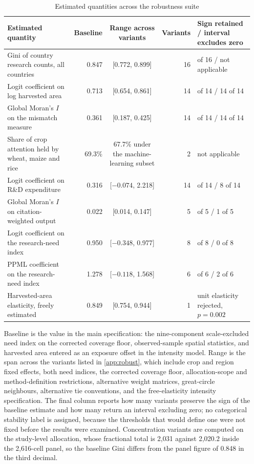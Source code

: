 \documentclass[ASNA,twocolumn]{USG}
\begin{document}
\begin{table}[!t]
\centering
\footnotesize
\setlength{\tabcolsep}{4pt}
\renewcommand{\arraystretch}{1.12}
\caption{Estimated quantities across the robustness suite}
\label{tab:robust}
\begin{tabular}{@{}>{\raggedright\arraybackslash}p{5.1cm}
                  r c r >{\raggedright\arraybackslash}p{3.9cm}@{}}
\toprule
Estimated quantity & Baseline & Range across variants & Variants & Sign retained / interval excludes zero \\
\midrule
Gini of country research counts, all countries & 0.847 & [0.772, 0.899] & 16 & 16 of 16 / not applicable \\
Logit coefficient on log harvested area & 0.713 & [0.654, 0.861] & 14 & 14 of 14 / 14 of 14 \\
Global Moran's $I$ on the mismatch measure & 0.361 & [0.187, 0.425] & 14 & 14 of 14 / 14 of 14 \\
Share of crop attention held by wheat, maize and rice & 69.3\% & 67.7\% under the machine-learning subset & 2 & not applicable \\
Logit coefficient on R\&D expenditure & 0.316 & [$-0.074$, 2.218] & 14 & 12 of 14 / 8 of 14 \\
Global Moran's $I$ on citation-weighted output & 0.022 & [0.014, 0.147] & 5 & 5 of 5 / 1 of 5 \\
Logit coefficient on the research-need index & 0.950 & [$-0.348$, 0.977] & 8 & 6 of 8 / 0 of 8 \\
PPML coefficient on the research-need index & 1.278 & [$-0.118$, 1.568] & 6 & 5 of 6 / 2 of 6 \\
Harvested-area elasticity, freely estimated & 0.849 & [0.754, 0.944] & 1 & unit elasticity rejected, $p=0.002$ \\
\bottomrule
\end{tabular}
\begin{tablenotes}
\item[] Baseline is the value in the main specification: the nine-component scale-excluded need index on
the corrected coverage floor, observed-sample spatial statistics, and harvested area entered as an
exposure offset in the intensity model. Range is the span across the variants listed in \ref{app:robust}, which include
crop and region fixed effects, both need indices, the corrected coverage floor, allocation-scope
and method-definition restrictions, alternative weight matrices, great-circle neighbours,
alternative tie conventions, and the free-elasticity intensity specification. The final column
reports how many variants preserve the sign of the baseline estimate and how many return an
interval excluding zero; no categorical stability label is assigned, because the thresholds that
would define one were not fixed before the results were examined. Concentration variants are
computed on the study-level allocation, whose fractional total is 2,031 against 2,020.2 inside the
2,616-cell panel, so the baseline Gini differs from the panel figure of 0.848 in the third decimal.
\end{tablenotes}
\end{table}
\end{document}
